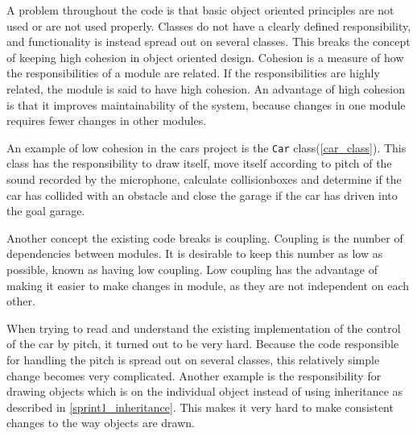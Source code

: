 A problem throughout the code is that basic object oriented principles are not used or are not used properly. 
Classes do not have a clearly defined responsibility, and functionality is instead spread out on several classes. 
This breaks the concept of keeping high cohesion in object oriented design. 
Cohesion is a measure of how the responsibilities of a module are related. 
If the responsibilities are highly related, the module is said to have high cohesion.
An advantage of high cohesion is that it improves maintainability of the system, because changes in one module requires fewer changes in other modules. 

An example of low cohesion in the cars project is the \lstinline!Car! class(\cref{car_class}).
This class has the responsibility to draw itself, move itself according to pitch of the sound recorded by the microphone, calculate collisionboxes and determine if the car has collided with an obstacle and close the garage if the car has driven into the goal garage.

Another concept the existing code breaks is coupling.
Coupling is the number of  dependencies between modules.
It is desirable to keep this number as low as possible, known as having low coupling.
Low coupling has the advantage of making it easier to make changes in module, as they are not independent on each other.

When trying to read and understand the existing implementation of the control of the car by pitch, it turned out to be very hard.
Because the code responsible for handling the pitch is spread out on several classes, this relatively simple change becomes very complicated.
Another example is the responsibility for drawing objects which is on the individual object instead of using inheritance as described in \cref{sprint1_inheritance}. 
This makes it very hard to make consistent changes to the way objects are drawn.
